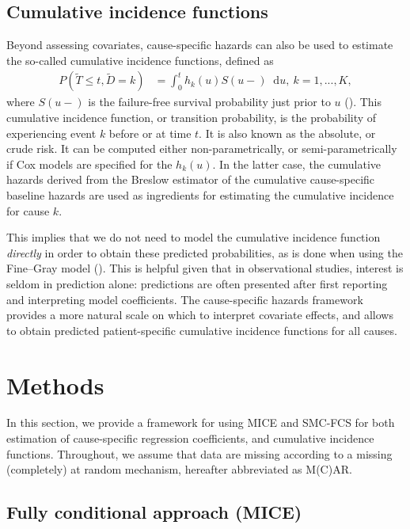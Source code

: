 \documentclass[
  letterpaper,
  paper=240mm:170mm,
  twoside=true,
  open=right,
  fontsize=10pt,
  pagesize=false,
  BCOR=15mm,
  DIV=14,
  headinclude=true,
  footinclude=false,
  headsepline=on]{scrbook}
\newcommand\diff{\mathop{}\!\mathrm{d}}
\begin{document}
\subsection{Cumulative incidence
functions}\label{cumulative-incidence-functions}

Beyond assessing covariates, cause-specific hazards can also be used to
estimate the so-called cumulative incidence functions, defined as
\begin{align}
    P(\tilde{T} \leq t, \tilde{D} = k) &= \int_{0}^{t}h_k(u)S(u-) \diff u, \ k=1,...,K,
\end{align} where \(S(u-)\) is the failure-free survival probability
just prior to \(u\)
(). This cumulative incidence function, or transition
probability, is the probability of experiencing event \(k\) before or at
time \(t\). It is also known as the absolute, or crude risk. It can be
computed either non-parametrically, or semi-parametrically if Cox models
are specified for the \(h_k(u)\). In the latter case, the cumulative
hazards derived from the Breslow estimator of the cumulative
cause-specific baseline hazards are used as ingredients for estimating
the cumulative incidence for cause \(k\).

This implies that we do not need to model the cumulative incidence
function \emph{directly} in order to obtain these predicted
probabilities, as is done when using the Fine--Gray model
().
This is helpful given that in observational studies, interest is seldom
in prediction alone: predictions are often presented after first
reporting and interpreting model coefficients. The cause-specific
hazards framework provides a more natural scale on which to interpret
covariate effects, and allows to obtain predicted patient-specific
cumulative incidence functions for all causes.

\section{Methods}\label{sec-imp-models}

In this section, we provide a framework for using MICE and SMC-FCS for
both estimation of cause-specific regression coefficients, and
cumulative incidence functions. Throughout, we assume that data are
missing according to a missing (completely) at random mechanism,
hereafter abbreviated as M(C)AR.

\subsection{Fully conditional approach
(MICE)}\label{sec-imp-models-main}
\end{document}
